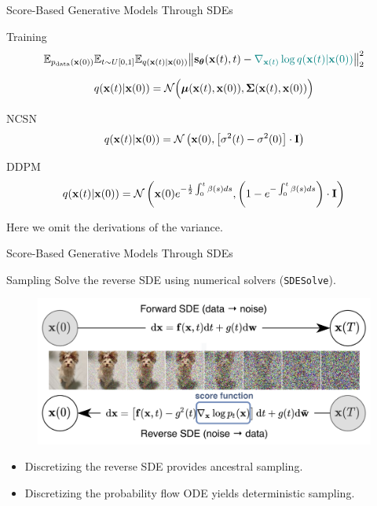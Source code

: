 \documentclass{beamer}
\begin{document}
\begin{frame}{Score-Based Generative Models Through SDEs}
	\begin{block}{Training}
		\vspace{-0.5cm}
		\[
			\mathbb{E}_{p_{\text{data}}(\mathbf{x}(0))} \mathbb{E}_{t \sim U[0, 1]} \mathbb{E}_{q(\mathbf{x}(t) | \mathbf{x}(0))}\bigl\| \mathbf{s}_{\boldsymbol{\theta}}(\mathbf{x}(t), t) - {\color{teal}\nabla_{\mathbf{x}(t)} \log q(\mathbf{x}(t) | \mathbf{x}(0))} \bigr\|^2_2 
		\]
		\vspace{-0.7cm}
	\end{block}
	\[
		q(\mathbf{x}(t) | \mathbf{x}(0)) = \mathcal{N}\Bigl(\boldsymbol{\mu}(\mathbf{x}(t), \mathbf{x}(0)), \boldsymbol{\Sigma}(\mathbf{x}(t), \mathbf{x}(0))\Bigr)
	\]
    \eqpause
	\vspace{-0.5cm}
	\begin{block}{NCSN}
		\vspace{-0.3cm}
		\[
			q(\mathbf{x}(t) | \mathbf{x}(0)) = \mathcal{N}\left(\mathbf{x}(0), \left[\sigma^2(t) - \sigma^2(0)\right] \cdot \mathbf{I}\right)
		\]
		\vspace{-0.5cm}
	\end{block}
    \eqpause
	\begin{block}{DDPM}
		\vspace{-0.5cm}
		\[
			q(\mathbf{x}(t) | \mathbf{x}(0)) = \mathcal{N}\left(\mathbf{x}(0) e^{-\frac{1}{2} \int_0^t\beta(s)ds}, \left(1 - e^{- \int_0^t\beta(s)ds}\right) \cdot \mathbf{I}\right)
		\]
		\vspace{-0.5cm}
	\end{block}
    \eqpause
	Here we omit the derivations of the variance.
	
\end{frame}
\begin{frame}{Score-Based Generative Models Through SDEs}
	\begin{block}{Sampling}
		Solve the reverse SDE using numerical solvers (\texttt{SDESolve}).
		\begin{figure}
			\includegraphics[width=0.8\linewidth]{figs/sbgm}
		\end{figure}
		\vspace{-0.5cm}
	\end{block}
    \eqpause
	\begin{itemize}
		\item Discretizing the reverse SDE provides ancestral sampling.
		\item Discretizing the probability flow ODE yields deterministic sampling.
	\end{itemize}
\end{frame}
\end{document}
